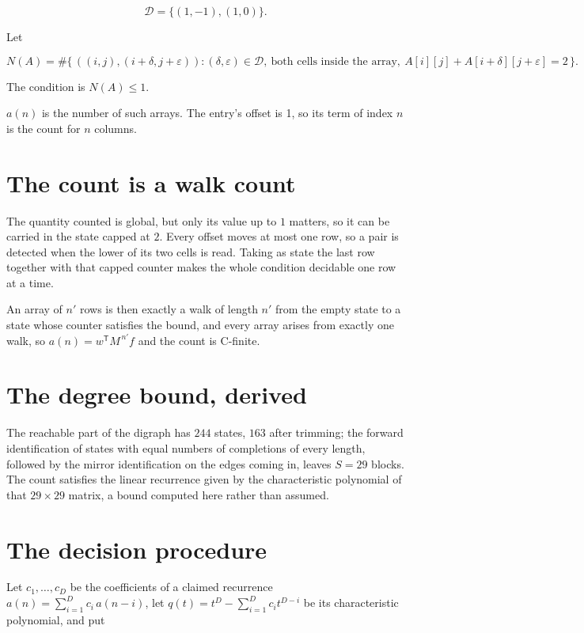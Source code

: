 \documentclass[11pt]{article}
\theoremstyle{definition}
\begin{document}
\[\mathcal{D} = \{(1,-1), (1,0)\}.\]

Let

\[N(A) = \#\bigl\{\,((i,j),(i{+}\delta,j{+}\varepsilon)) : (\delta,\varepsilon) \in \mathcal{D},\ \text{both cells inside the array},\ A[i][j] + A[i{+}\delta][j{+}\varepsilon] = 2\,\bigr\}.\]

The condition is $N(A) \le 1$.

$a(n)$ is the number of such arrays. The entry's offset is 1, so its term of index $n$ is the count for $n$ columns.

\section{The count is a walk count}

The quantity counted is global, but only its value up to $1$ matters, so it can be carried in the state capped at $2$. Every offset moves at most one row, so a pair is detected when the lower of its two cells is read. Taking as state the last row together with that capped counter makes the whole condition decidable one row at a time.

An array of $n'$ rows is then exactly a walk of length $n'$ from the empty state to a state whose counter satisfies the bound, and every array arises from exactly one walk, so $a(n) = w^{\mathsf T}M^{\,n'}f$ and the count is C-finite.

\section{The degree bound, derived}

The reachable part of the digraph has $244$ states, $163$ after trimming; the forward identification of states with equal numbers of completions of every length, followed by the mirror identification on the edges coming in, leaves $S = 29$ blocks. The count satisfies the linear recurrence given by the characteristic polynomial of that $29\times29$ matrix, a bound computed here rather than assumed.

\section{The decision procedure}

Let $c_1,\dots,c_D$ be the coefficients of a claimed recurrence $a(n) = \sum_{i=1}^{D} c_i\,a(n-i)$, let $q(t) = t^{D} - \sum_{i=1}^{D} c_i t^{D-i}$ be its characteristic polynomial, and put
\end{document}
